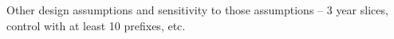 Other design assumptions and sensitivity to those assumptions -- 3 year slices,
control with at least 10 prefixes, etc.


\subsection{}

%
%
%
%
%
%
%
%
%
